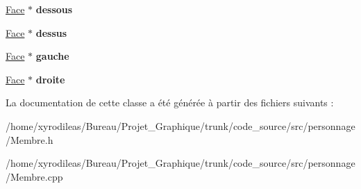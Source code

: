 \begin{DoxyCompactItemize}
\item 
\hypertarget{classMembre_a822affb2c9c922cdaadaf73b63d54de4}{\hyperlink{classFace}{Face} $\ast$ {\bfseries dessous}}\label{classMembre_a822affb2c9c922cdaadaf73b63d54de4}

\item 
\hypertarget{classMembre_a85dae0ff7b515965fa2dc7f3a99b7efb}{\hyperlink{classFace}{Face} $\ast$ {\bfseries dessus}}\label{classMembre_a85dae0ff7b515965fa2dc7f3a99b7efb}

\item 
\hypertarget{classMembre_ad39f9dc6447e687bb1ac3f5c6cf50f1d}{\hyperlink{classFace}{Face} $\ast$ {\bfseries gauche}}\label{classMembre_ad39f9dc6447e687bb1ac3f5c6cf50f1d}

\item 
\hypertarget{classMembre_a4e4b1a707119e9edc9c24827447bfc99}{\hyperlink{classFace}{Face} $\ast$ {\bfseries droite}}\label{classMembre_a4e4b1a707119e9edc9c24827447bfc99}

\end{DoxyCompactItemize}


La documentation de cette classe a été générée à partir des fichiers suivants \-:\begin{DoxyCompactItemize}
\item 
/home/xyrodileas/\-Bureau/\-Projet\-\_\-\-Graphique/trunk/code\-\_\-source/src/personnage/Membre.\-h\item 
/home/xyrodileas/\-Bureau/\-Projet\-\_\-\-Graphique/trunk/code\-\_\-source/src/personnage/Membre.\-cpp\end{DoxyCompactItemize}
